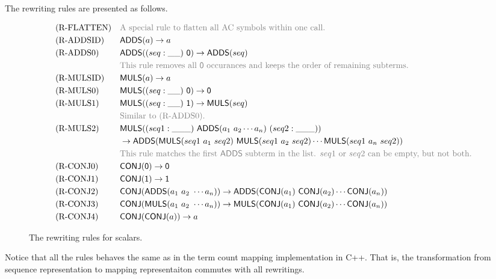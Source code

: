 \documentclass{article}
\begin{document}
The rewriting rules are presented as follows.

\begin{figure}[h]
    \begin{align*}
        & \text{(R-FLATTEN)} &&
        \textcolor{gray}{\text{A special rule to flatten all AC symbols within one call.}} \\
        & \text{(R-ADDSID)} &&
        \ADDS(a) \to a \\
        & \text{(R-ADDS0)} &&
        \ADDS((seq:\_ \_)\ \ZERO) \to \ADDS(seq) \\
        & && \textcolor{gray}{\text{This rule removes all $\ZERO$ occurances and keeps the order of remaining subterms.}} \\
        & \text{(R-MULSID)} &&
        \MULS(a) \to a \\
        & \text{(R-MULS0)} &&
        \MULS((seq: \_ \_)\ \ZERO) \to \ZERO \\
        & \text{(R-MULS1)} &&
        \MULS((seq: \_ \_)\ \ONE) \to \MULS(seq) \\
        & && \textcolor{gray}{\text{Similar to (R-ADDS0).}} \\
        & \text{(R-MULS2)} &&
        \MULS((seq1: \_ \_ \_)\ \ADDS(a_1\ a_2 \cdots a_n)\ (seq2: \_ \_ \_)) \\
        & && \to \ADDS(\MULS(seq1\ a_1\ seq2)\ \MULS(seq1\ a_2\ seq2) \cdots \MULS(seq1\ a_n\ seq2)) \\
        & && \textcolor{gray}{\text{This rule matches the first $\ADDS$ subterm in the list. $seq1$ or $seq2$ can be empty, but not both.}} \\
        & \text{(R-CONJ0)} &&
        \CONJ(\ZERO) \to \ZERO \\
        & \text{(R-CONJ1)} &&
        \CONJ(\ONE) \to \ONE \\
        & \text{(R-CONJ2)} &&
        \CONJ(\ADDS(a_1\ a_2\ \cdots a_n)) \to \ADDS(\CONJ(a_1)\ \CONJ(a_2) \cdots \CONJ(a_n)) \\
        & \text{(R-CONJ3)} &&
        \CONJ(\MULS(a_1\ a_2\ \cdots a_n)) \to \MULS(\CONJ(a_1)\ \CONJ(a_2) \cdots \CONJ(a_n)) \\
        & \text{(R-CONJ4)} &&
        \CONJ(\CONJ(a)) \to a
    \end{align*}
    \caption{The rewriting rules for scalars.}
\end{figure}

Notice that all the rules behaves the same as in the term count mapping implementation in C++. That is, the transformation from sequence representation to mapping representaiton commutes with all rewritings.
\end{document}

